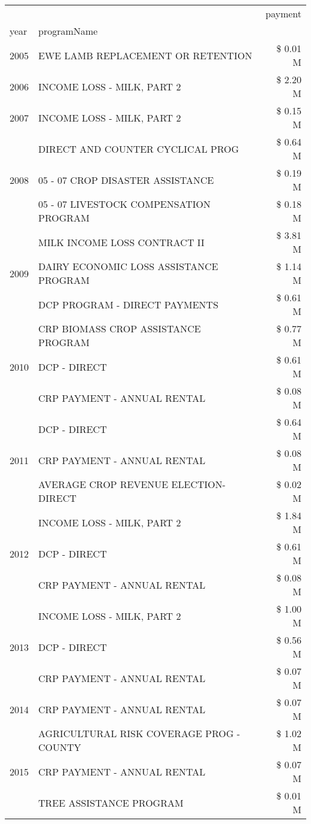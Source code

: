 \begin{tabular}{llr}
\toprule
 &  & payment \\
year & programName &  \\
\midrule
2005 & EWE LAMB REPLACEMENT OR RETENTION & \$ 0.01 M \\
\cline{1-3}
2006 & INCOME LOSS - MILK, PART 2 & \$ 2.20 M \\
\cline{1-3}
2007 & INCOME LOSS - MILK, PART 2 & \$ 0.15 M \\
\cline{1-3}
\multirow[t]{3}{*}{2008} & DIRECT AND COUNTER CYCLICAL PROG & \$ 0.64 M \\
 & 05 - 07 CROP DISASTER ASSISTANCE & \$ 0.19 M \\
 & 05 - 07 LIVESTOCK COMPENSATION PROGRAM & \$ 0.18 M \\
\cline{1-3}
\multirow[t]{3}{*}{2009} & MILK INCOME LOSS CONTRACT II & \$ 3.81 M \\
 & DAIRY ECONOMIC LOSS ASSISTANCE PROGRAM & \$ 1.14 M \\
 & DCP PROGRAM - DIRECT PAYMENTS & \$ 0.61 M \\
\cline{1-3}
\multirow[t]{3}{*}{2010} & CRP BIOMASS CROP ASSISTANCE PROGRAM & \$ 0.77 M \\
 & DCP - DIRECT & \$ 0.61 M \\
 & CRP PAYMENT - ANNUAL RENTAL & \$ 0.08 M \\
\cline{1-3}
\multirow[t]{3}{*}{2011} & DCP - DIRECT & \$ 0.64 M \\
 & CRP PAYMENT - ANNUAL RENTAL & \$ 0.08 M \\
 & AVERAGE CROP REVENUE ELECTION-DIRECT & \$ 0.02 M \\
\cline{1-3}
\multirow[t]{3}{*}{2012} & INCOME LOSS - MILK, PART 2 & \$ 1.84 M \\
 & DCP - DIRECT & \$ 0.61 M \\
 & CRP PAYMENT - ANNUAL RENTAL & \$ 0.08 M \\
\cline{1-3}
\multirow[t]{3}{*}{2013} & INCOME LOSS - MILK, PART 2 & \$ 1.00 M \\
 & DCP - DIRECT & \$ 0.56 M \\
 & CRP PAYMENT - ANNUAL RENTAL & \$ 0.07 M \\
\cline{1-3}
2014 & CRP PAYMENT - ANNUAL RENTAL & \$ 0.07 M \\
\cline{1-3}
\multirow[t]{3}{*}{2015} & AGRICULTURAL RISK COVERAGE PROG - COUNTY & \$ 1.02 M \\
 & CRP PAYMENT - ANNUAL RENTAL & \$ 0.07 M \\
 & TREE ASSISTANCE PROGRAM & \$ 0.01 M \\

\end{tabular}
